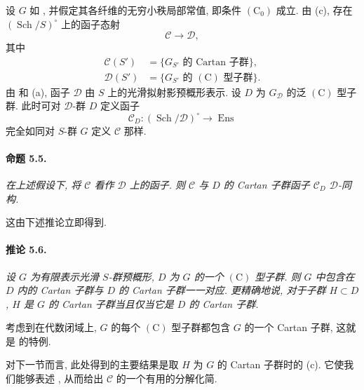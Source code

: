 设 \(G\) 如 , 并假定其各纤维的无穷小秩局部常值, 即条件 \((\mathrm C_0)\) 成立. 由 \textup{(c)}, 存在 \((\operatorname{Sch}/S)^\circ\) 上的函子态射
\[
  \mathcal C\longrightarrow\mathcal D,
\]
其中
\[
  \begin{aligned}
  \mathcal C(S')&=
    \{G_{S'}\text{ 的 Cartan 子群}\},\\
  \mathcal D(S')&=
    \{G_{S'}\text{ 的 \((\mathrm C)\) 型子群}\}.
  \end{aligned}
\]
由  和 \textup{(a)}, 函子 \(\mathcal D\) 由 \(S\) 上的光滑拟射影预概形表示. 设 \(D\) 为 \(G_{\mathcal D}\) 的泛 \((\mathrm C)\) 型子群. 此时可对 \(\mathcal D\)-群 \(D\) 定义函子
\[
  \mathcal C_D\colon
  (\operatorname{Sch}/\mathcal D)^\circ
  \longrightarrow\operatorname{Ens}
\]
完全如同对 \(S\)-群 \(G\) 定义 \(\mathcal C\) 那样.

\paragraph{\textbf{命题 5.5.}}
{\itshape 在上述假设下, 将 \(\mathcal C\) 看作 \(\mathcal D\) 上的函子. 则 \(\mathcal C\) 与 \(D\) 的 Cartan 子群函子 \(\mathcal C_D\) \(\mathcal D\)-同构.}

这由下述推论立即得到.

\paragraph{\textbf{推论 5.6.}}
{\itshape 设 \(G\) 为有限表示光滑 \(S\)-群预概形, \(D\) 为 \(G\) 的一个 \((\mathrm C)\) 型子群. 则 \(G\) 中包含在 \(D\) 内的 Cartan 子群与 \(D\) 的 Cartan 子群一一对应. 更精确地说, 对于子群 \(H\subset D\), \(H\) 是 \(G\) 的 Cartan 子群当且仅当它是 \(D\) 的 Cartan 子群.}

考虑到在代数闭域上, \(G\) 的每个 \((\mathrm C)\) 型子群都包含 \(G\) 的一个 Cartan 子群, 这就是 \textup{} 的特例.

对下一节而言, 此处得到的主要结果是取 \(H\) 为 \(G\) 的 Cartan 子群时的 \textup{(c)}. 它使我们能够表述 , 从而给出 \(\mathcal C\) 的一个有用的分解化简.




